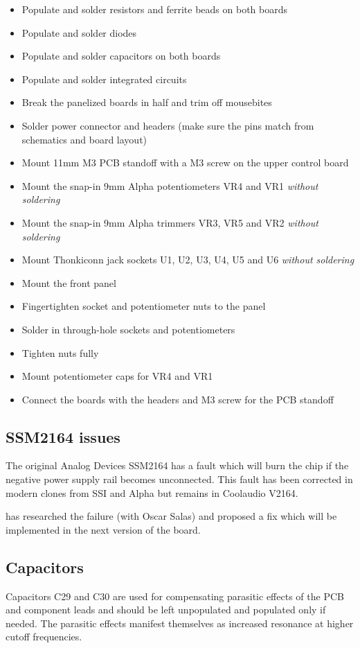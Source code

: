 \documentclass{article}
\begin{document}
\begin{itemize}
\item Populate and solder resistors and ferrite beads on both boards
\item Populate and solder diodes
\item Populate and solder capacitors on both boards
\item Populate and solder integrated circuits
\item Break the panelized boards in half and trim off mousebites
\item Solder power connector and headers (make sure the pins match from schematics and board layout)
\item Mount 11mm M3 PCB standoff with a M3 screw on the upper control board
\item Mount the snap-in 9mm Alpha potentiometers VR4 and VR1 \emph{without soldering}
\item Mount the snap-in 9mm Alpha trimmers VR3, VR5 and VR2 \emph{without soldering}
\item Mount Thonkiconn jack sockets U1, U2, U3, U4, U5 and U6 \emph{without soldering}
\item Mount the front panel
\item Fingertighten socket and potentiometer nuts to the panel
\item Solder in through-hole sockets and potentiometers
\item Tighten nuts fully
\item Mount potentiometer caps for VR4 and VR1
\item Connect the boards with the headers and M3 screw for the PCB standoff
\end{itemize}

\subsection{SSM2164 issues}
The original Analog Devices SSM2164 has a fault which will burn the chip if the negative power supply rail becomes unconnected. This fault has been corrected in modern clones from SSI and Alpha but remains in Coolaudio V2164.\newline

\cite{johnson} has researched the failure (with Oscar Salas) and proposed a fix which will be implemented in the next version of the board.

\subsection{Capacitors}
Capacitors C29 and C30 are used for compensating parasitic effects of the PCB and component leads and should be left unpopulated and populated only if needed. The parasitic effects manifest themselves as increased resonance at higher cutoff frequencies.
\end{document}
